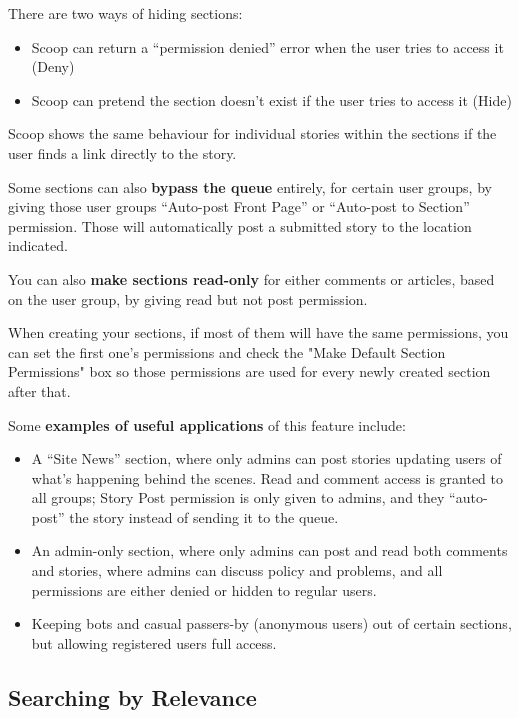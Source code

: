 There are two ways of hiding sections: 
\begin{itemize}
\item Scoop can return a ``permission denied'' error when the user tries to access it (Deny) 
\item Scoop can pretend the section doesn't exist if the user tries to access it (Hide)
\end{itemize}

Scoop shows the same behaviour for individual stories within the sections if the user finds a link directly to the story.

Some sections can also {\bf bypass the queue} entirely, for certain user groups, by giving those user groups ``Auto-post Front Page'' or ``Auto-post to Section'' permission.  Those will automatically post a submitted story to the location indicated.

You can also {\bf make sections read-only} for either comments or articles, based on the user group, by giving read but not post permission.

When creating your sections, if most of them will have the same permissions, you can set the first one's permissions and check the "Make Default Section Permissions" box so those permissions are used for every newly created section after that.

Some {\bf examples of useful applications} of this feature include: 

\begin{itemize}
\item A ``Site News'' section, where only admins can post stories updating users of what's happening behind the scenes.  Read and comment access is granted to all groups; Story Post permission is only given to admins, and they ``auto-post'' the story instead of sending it to the queue.
\item An admin-only section, where only admins can post and read both comments and stories, where admins can discuss policy and problems, and all permissions are either denied or hidden to regular users.
\item Keeping bots and casual passers-by (anonymous users) out of certain sections, but allowing registered users full access.
\end{itemize}

\subsection{Searching by Relevance}
\label{features-fulltext}

